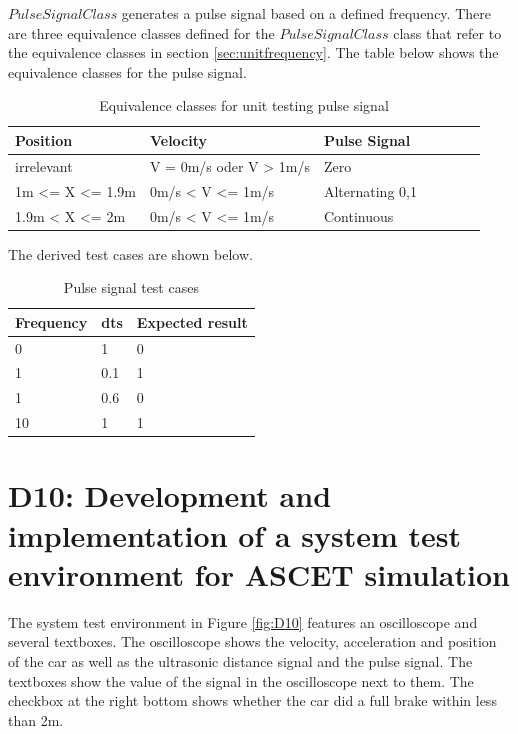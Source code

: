$PulseSignalClass$ generates a pulse signal based on a defined frequency.
There are three equivalence classes defined for the $PulseSignalClass$ class that refer to the equivalence classes in section \ref{sec:unitfrequency}. 
The table below shows the equivalence classes for the pulse signal.
\begin{table}[H]
\centering
\caption{Equivalence classes for unit testing pulse signal}
\begin{adjustbox}{width=1\textwidth, center=\textwidth}
\renewcommand{\arraystretch}{1}
\begin{tabular}{lllllll}
\textbf{Position} & \textbf{Velocity} & \textbf{Pulse Signal} \\\hline
irrelevant & V = 0m/s oder V > 1m/s & Zero\\
1m <= X <= 1.9m  & 0m/s < V <= 1m/s & Alternating 0,1\\
1.9m < X <= 2m  & 0m/s < V <= 1m/s &Continuous
\end{tabular}
\end{adjustbox}
\end{table}

The derived test cases are shown below.

\begin{table}[H]
\centering
\caption{Pulse signal test cases}
\renewcommand{\arraystretch}{1}
\begin{tabular}{lll}
\textbf{Frequency} & \textbf{dts} & \textbf{Expected result} \\\hline
0         & 1   & 0               \\
1         & 0.1   & 1               \\
1         & 0.6   & 0               \\
10        & 1   & 1              
\end{tabular}
\end{table}

\chapter{D10: Development and implementation of a system test environment for ASCET simulation}\label{cha:D10}

The system test environment in Figure \ref{fig:D10} features an oscilloscope and several textboxes. 
The oscilloscope shows the velocity, acceleration and position of the car as well as the ultrasonic distance signal and the pulse signal. The textboxes show the value of the signal in the oscilloscope next to them. 
The checkbox at the right bottom shows whether the car did a full brake within less than 2m.

